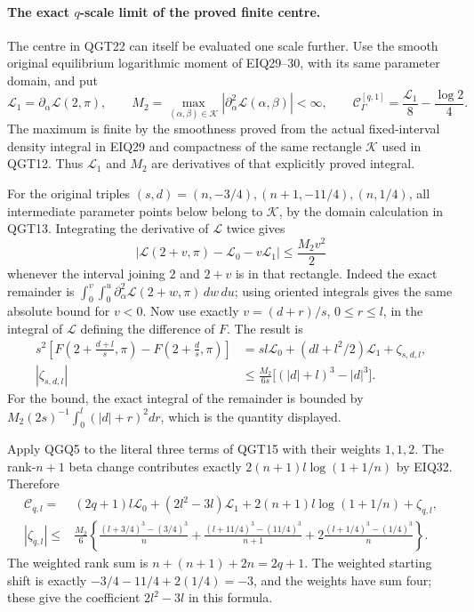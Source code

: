 \documentclass[11pt,a4paper]{article}
\begin{document}
\paragraph{The exact \(q\)-scale limit of the proved finite centre.}
The centre in QGT22 can itself be evaluated one scale further.
Use the smooth original equilibrium logarithmic moment of EIQ29--30,
with its same parameter domain, and put
\[
 \mathcal L_1=\partial_\alpha\mathcal L(2,\pi),\qquad
 M_2=\max_{(\alpha,\beta)\in\mathcal K}
                 |\partial_\alpha^2\mathcal L(\alpha,\beta)|<\infty,
 \qquad
 \mathcal C_\Gamma^{[q,1]}=\frac{\mathcal L_1}{8}
                              -\frac{\log2}{4}.
 \tag{QGQ4}
\]
The maximum is finite by the smoothness proved from the actual
fixed-interval density integral in EIQ29 and compactness of the same
rectangle $\mathcal K$ used in QGT12. Thus $\mathcal L_1$ and $M_2$
are derivatives of that explicitly proved integral.

For the original triples
$(s,d)=(n,-3/4),(n+1,-11/4),(n,1/4)$, all intermediate parameter
points below belong to $\mathcal K$, by the domain calculation in
QGT13. Integrating the derivative of $\mathcal L$ twice gives
\[
 \left|\mathcal L(2+v,\pi)-\mathcal L_0-v\mathcal L_1\right|
                       \le\frac{M_2v^2}{2}
\]
whenever the interval joining $2$ and $2+v$ is in that rectangle.
Indeed the exact remainder is
$\int_0^v\int_0^u\partial_\alpha^2\mathcal L(2+w,\pi)\,dw\,du$;
using oriented integrals gives the same absolute bound for $v<0$.
Now use exactly $v=(d+r)/s$, $0\le r\le l$, in the integral
of $\mathcal L$ defining the difference of $F$. The result is
\[
\begin{split}
 s^2\!\left[F\left(2+\frac{d+l}s,\pi\right)
              -F\left(2+\frac ds,\pi\right)\right]
   &=sl\mathcal L_0+(dl+l^2/2)\mathcal L_1+\zeta_{s,d,l},\\
 |\zeta_{s,d,l}|
   &\le\frac{M_2}{6s}\bigl[(|d|+l)^3-|d|^3\bigr].
\end{split}
 \tag{QGQ5}
\]
For the bound, the exact integral of the remainder is bounded by
$M_2(2s)^{-1}\int_0^l(|d|+r)^2dr$, which is the quantity displayed.

Apply QGQ5 to the literal three terms of QGT15 with their weights
$1,1,2$. The rank-$n+1$ beta change contributes exactly
$2(n+1)l\log(1+1/n)$ by EIQ32. Therefore
\[
\begin{split}
 \mathcal C_{q,l}={}&(2q+1)l\mathcal L_0
 +(2l^2-3l)\mathcal L_1
 +2(n+1)l\log(1+1/n)+\zeta_{q,l},\\
 |\zeta_{q,l}|\le{}&\frac{M_2}{6}
 \left\{
 \frac{(l+3/4)^3-(3/4)^3}{n}
 +\frac{(l+11/4)^3-(11/4)^3}{n+1}
 +2\frac{(l+1/4)^3-(1/4)^3}{n}
 \right\}.
\end{split}
 \tag{QGQ6}
\]
The weighted rank sum is $n+(n+1)+2n=2q+1$.
The weighted starting shift is exactly
$-3/4-11/4+2(1/4)=-3$, and the weights have sum four;
these give the coefficient $2l^2-3l$ in this formula.
\end{document}
